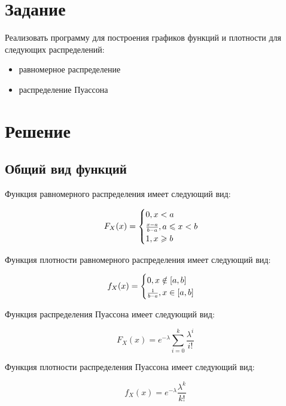 \documentclass[12pt]{report}
\begin{document}
	
	\setcounter{page}{2}

\chapter{Задание}
Реализовать программу для построения графиков функций и плотности для следующих распределений: 

\begin{itemize}
	\item равномерное распределение
	\item распределение Пуассона
\end{itemize}

\chapter{Решение}
\section{Общий вид функций}

Функция равномерного распределения имеет следующий вид:

\begin{equation*}
	F_X(x) = 
	\begin{cases}
		0, x < a \\
		\resizebox{.045\hsize}{!}{$\frac{x - a}{b - a}$}, a \leqslant x < b \\
		1, x \geqslant b
	\end{cases}
\end{equation*}

Функция плотности равномерного распределения имеет следующий вид:

\begin{equation*}
	f_X(x) = 
	\begin{cases}
		0, x \notin [a, b] \\
		\resizebox{.04\hsize}{!}{$\frac{1}{b - a}$}, x \in [a, b] \\
	\end{cases}
\end{equation*}

Функция распределения Пуассона имеет следующий вид:

\begin{equation*}
	F_X(x) = e^{-\lambda}\sum_{i=0}^{k}{\frac{\lambda^i}{i!}}
\end{equation*}

Функция плотности распределения Пуассона имеет следующий вид:

\begin{equation*}
	f_X(x) = e^{-\lambda}\frac{\lambda^k}{k!}
\end{equation*}
\end{document}
